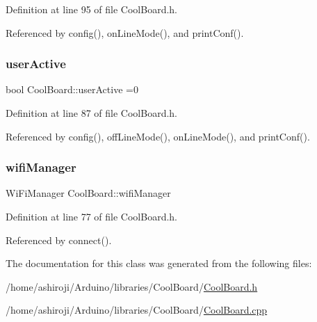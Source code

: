 Definition at line 95 of file Cool\+Board.\+h.



Referenced by config(), on\+Line\+Mode(), and print\+Conf().

\mbox{\label{classCoolBoard_a6395459131d6889a3005f79c7a35e964}} 
\subsubsection{\texorpdfstring{user\+Active}{userActive}}
{\footnotesize\ttfamily bool Cool\+Board\+::user\+Active =0\hspace{0.3cm}{\ttfamily [private]}}



Definition at line 87 of file Cool\+Board.\+h.



Referenced by config(), off\+Line\+Mode(), on\+Line\+Mode(), and print\+Conf().

\mbox{\label{classCoolBoard_a55b28656e295140928557c47d7fff01e}} 
\subsubsection{\texorpdfstring{wifi\+Manager}{wifiManager}}
{\footnotesize\ttfamily Wi\+Fi\+Manager Cool\+Board\+::wifi\+Manager\hspace{0.3cm}{\ttfamily [private]}}



Definition at line 77 of file Cool\+Board.\+h.



Referenced by connect().



The documentation for this class was generated from the following files\+:\begin{DoxyCompactItemize}
\item 
/home/ashiroji/\+Arduino/libraries/\+Cool\+Board/\hyperlink{CoolBoard_8h}{Cool\+Board.\+h}\item 
/home/ashiroji/\+Arduino/libraries/\+Cool\+Board/\hyperlink{CoolBoard_8cpp}{Cool\+Board.\+cpp}\end{DoxyCompactItemize}
